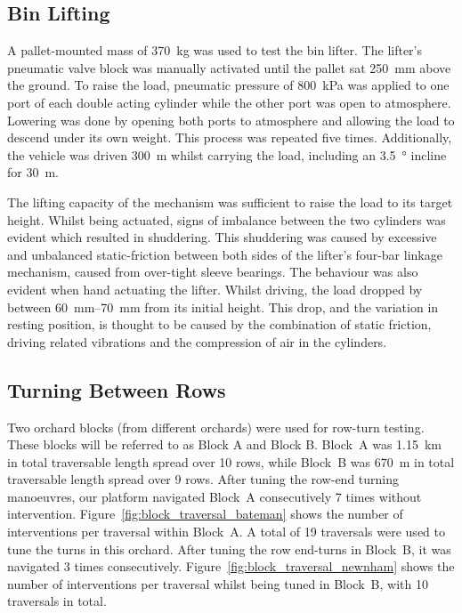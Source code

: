 \documentclass[preprint,authoryear,12pt]{elsarticle}
\begin{document}
  \subsection{Bin Lifting}

    A pallet-mounted mass of \SI{370}{\kilo\gram} was used to test the bin lifter.
    The lifter's pneumatic valve block was manually activated until the pallet sat \SI{250}{\milli\meter} above the ground.
    To raise the load, pneumatic pressure of \SI{800}{\kilo\pascal} was applied to one port of each double acting cylinder while the other port was open to atmosphere.
    Lowering was done by opening both ports to atmosphere and allowing the load to descend under its own weight.
    This process was repeated five times.
    Additionally, the vehicle was driven \SI{300}{\meter} whilst carrying the load, including an \SI{3.5}{\degree} incline for \SI{30}{\meter}.

    The lifting capacity of the mechanism was sufficient to raise the load to its target height.
    Whilst being actuated, signs of imbalance between the two cylinders was evident which resulted in shuddering.
    This shuddering was caused by excessive and unbalanced static-friction between both sides of the lifter's four-bar linkage mechanism, caused from over-tight sleeve bearings.
    The behaviour was also evident when hand actuating the lifter.
    Whilst driving, the load dropped by between \SIrange{60}{70}{\milli\meter} from its initial height.
    This drop, and the variation in resting position, is thought to be caused by the combination of static friction, driving related vibrations and the compression of air in the cylinders.

  \subsection{Turning Between Rows}

    Two orchard blocks (from different orchards) were used for row-turn testing.
    These blocks will be referred to as Block A and Block B.
    Block~A was \SI{1.15}{\kilo\meter} in total traversable length spread over 10 rows, while Block~B was \SI{670}{\meter} in total traversable length spread over 9 rows.
    After tuning the row-end turning manoeuvres, our platform navigated Block~A consecutively 7 times without intervention.
    Figure~\ref{fig:block_traversal_bateman} shows the number of interventions per traversal within Block~A.
    A total of 19 traversals were used to tune the turns in this orchard.
    After tuning the row end-turns in Block~B, it was navigated 3 times consecutively.
    Figure~\ref{fig:block_traversal_newnham} shows the number of interventions per traversal whilst being tuned in Block~B, with 10 traversals in total.
\end{document}
